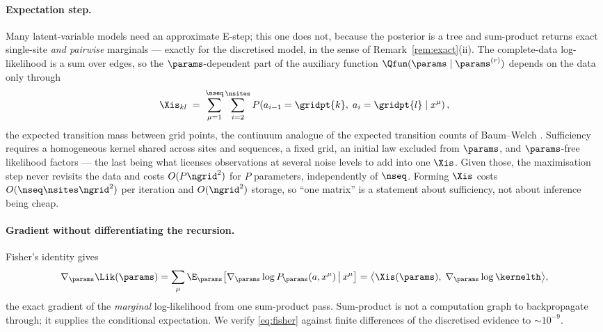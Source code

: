 \documentclass{article}
\begin{document}
\paragraph{Expectation step.} Many latent-variable models need an approximate E-step; this one
does not, because the posterior is a tree and sum-product returns exact single-site \emph{and
pairwise} marginals --- exactly for the discretised model, in the sense of
Remark~\ref{rem:exact}(ii). The complete-data log-likelihood is a sum over edges, so the
$\params$-dependent part of the auxiliary function $\Qfun(\params\mid\params^{(r)})$ depends on
the data only through
\begin{equation}
\label{eq:xi}
\Xis_{kl} \;=\; \sum_{\mu=1}^{\nseq}\sum_{i=2}^{\nsites}
P\!\left(a_{i-1}=\gridpt{k},\; a_i=\gridpt{l} \;\middle|\; x^\mu\right),
\end{equation}
the expected transition mass between grid points, the continuum analogue of the expected
transition counts of Baum--Welch \citep{baum1970}. Sufficiency requires a homogeneous kernel
shared across sites and sequences, a fixed grid, an initial law excluded from $\params$, and
$\params$-free likelihood factors --- the last being what licenses observations at several noise
levels to add into one $\Xis$. Given those, the maximisation step never revisits the data and
costs $O(P\ngrid^2)$ for $P$ parameters, independently of $\nseq$. Forming $\Xis$ costs
$O(\nseq\nsites\ngrid^2)$ per iteration and $O(\ngrid^2)$ storage, so ``one matrix'' is a
statement about sufficiency, not about inference being cheap.

\paragraph{Gradient without differentiating the recursion.} Fisher's identity
\citep{fisher1925,louis1982,cappe2005} gives
\begin{equation}
\label{eq:fisher}
\nabla_\params \Lik(\params)
= \sum_{\mu}\E_\params\!\left[\nabla_\params \log P_\params(a,x^\mu)\,\middle|\,x^\mu\right]
= \big\langle \Xis(\params),\; \nabla_\params \log \kernelth \big\rangle ,
\end{equation}
the exact gradient of the \emph{marginal} log-likelihood from one sum-product pass. Sum-product
is not a computation graph to backpropagate through; it supplies the conditional expectation. We
verify \eqref{eq:fisher} against finite differences of the discretised evidence to
$\sim10^{-9}$.
\end{document}
